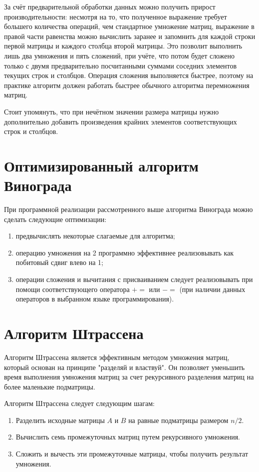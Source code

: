 За счёт предварительной обработки данных можно получить прирост производительности: несмотря на то, что полученное выражение требует большего количества операций, чем стандартное умножение матриц, выражение в правой части равенства можно вычислить заранее и запомнить для каждой строки первой матрицы и каждого столбца второй матрицы. Это позволит выполнить лишь два умножения и пять сложений, при учёте, что потом будет сложено только с двумя предварительно посчитанными суммами соседних элементов текущих строк и столбцов. Операция сложения выполняется
быстрее, поэтому на практике алгоритм должен работать быстрее обычного алгоритма перемножения матриц.

Стоит упомянуть, что при нечётном значении размера матрицы нужно дополнительно добавить произведения крайних элементов соответствующих строк и столбцов.

\section{Оптимизированный алгоритм Винограда}

При программной реализации рассмотренного выше алгоритма Винограда можно сделать следующие оптимизации:
\begin{enumerate}
	\item предвычислять некоторые слагаемые для алгоритма;
	\item операцию умножения на 2 программно эффективнее реализовывать как побитовый сдвиг влево на 1;
	\item операции сложения и вычитания с присваиванием следует реализовывать при помощи соответствующего оператора $+=$ или $-=$ (при наличии данных операторов в выбранном языке программирования).
\end{enumerate}

\section{Алгоритм Штрассена}
Алгоритм Штрассена является эффективным методом умножения матриц, который основан на принципе "разделяй и властвуй". Он позволяет уменьшить время выполнения умножения матриц за счет рекурсивного разделения матриц на более маленькие подматрицы\cite{book_shtrassen}.

Алгоритм Штрассена следует следующим шагам:
\begin{enumerate}
	\item Разделить исходные матрицы $A$ и $B$ на равные подматрицы размером $n/2$.
	\item Вычислить семь промежуточных матриц путем рекурсивного умножения.
	\item Сложить и вычесть эти промежуточные матрицы, чтобы получить результат умножения.
\end{enumerate}

